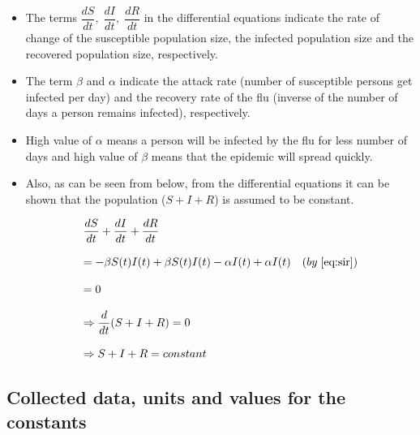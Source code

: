 \documentclass[11pt, a4paper, twoside]{report}
\begin{document}
\begin{itemize}
 \item The terms $\dfrac{dS}{dt},\;\dfrac{dI}{dt},\;\dfrac{dR}{dt}$ in the differential equations indicate the rate of change of the susceptible population size, the infected population size and the recovered population size, respectively. 
 \item The term $\beta$ and $\alpha$ indicate the attack rate (number of susceptible persons get infected per day) and the recovery rate of the flu (inverse of the number of days a person remains infected), respectively. 
 \item High value of $\alpha$ means a person will be infected by the flu for less number of days and high value of $\beta$ means that the epidemic will spread quickly.
 \item Also, as can be seen from below, from the differential equations it can be shown that the population ($S + I + R$) is assumed to be constant.
 
 \begin{equation*}
 \begin{array}{ll} 
 \dfrac{dS}{dt}+\dfrac{dI}{dt}+\dfrac{dR}{dt} & \\\\
 = -\beta S(t)I(t) + \beta S(t)I(t) - \alpha I(t) + \alpha I(t) & (by\; \ref{eq:sir}) \\\\
 = 0 & \\\\
 \Rightarrow \dfrac{d}{dt}(S+I+R) = 0 & \\\\
 \Rightarrow S+I+R = constant & 
 \end{array}
 \end{equation*}
\end{itemize}

\subsection{Collected data, units and values for the constants}
\end{document}
